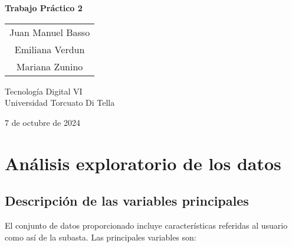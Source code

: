 \documentclass[a4paper,11pt]{article}
\begin{document}
\begin{titlepage}
    \centering
    \vspace*{5cm}  
    
    {\Huge\textbf{Trabajo Práctico 2}}\\[1.5cm]
    
    
    \begin{tabular}{c}  %
        {\Large Juan Manuel Basso}\\
        {\Large Emiliana Verdun}\\
        {\Large Mariana Zunino}
    \end{tabular}

    \vspace{1cm}
    
    {\Large Tecnología Digital VI}\\[0.5cm]
    {\Large Universidad Torcuato Di Tella}\\[0.5cm]
    
    \vfill
    
    {\Large 7 de octubre de 2024}  %
\end{titlepage}

\section{Análisis exploratorio de los datos}

\subsection{Descripción de las variables principales}

El conjunto de datos proporcionado incluye características referidas al usuario como así de la subasta. Las principales variables son:
\end{document}
